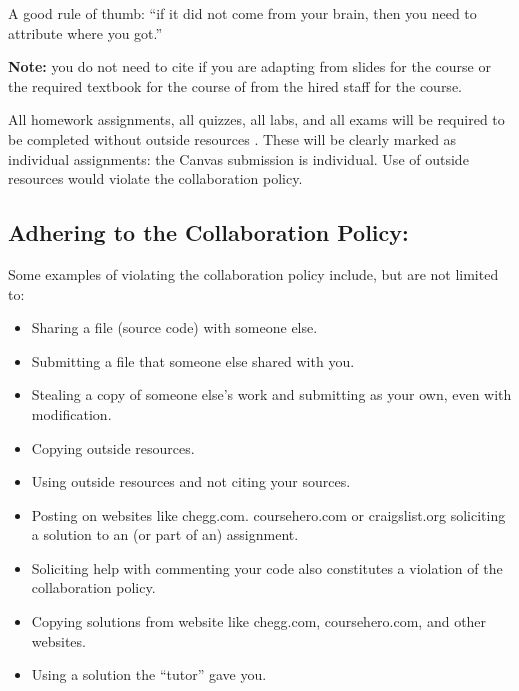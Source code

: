 
A good rule of thumb: “if it did not come from your brain, then you need to attribute where you got.”

\textbf{Note: }you do not need to cite if you are adapting from slides for the course or the required textbook for the course of from the hired staff for the course.

All homework assignments, all quizzes, all labs, and all exams will be required to be completed without outside resources . These will be clearly marked as individual assignments: the Canvas submission is individual. Use of outside resources would violate the collaboration policy.

\subsection{Adhering to the Collaboration Policy:}

Some examples of violating the collaboration policy include, but are not limited to:

\begin{itemize}
    \item Sharing a file (source code) with someone else.
    \item Submitting a file that someone else shared with you.
    \item Stealing a copy of someone else’s work and submitting as your own, even with modification.
    \item Copying outside resources.
    \item Using outside resources and not citing your sources.
    \item Posting on websites like chegg.com. coursehero.com or craigslist.org soliciting a solution to an (or part of an) assignment.
    \item Soliciting help with commenting your code also constitutes a violation of the collaboration policy.
    \item Copying solutions from website like chegg.com, coursehero.com, and other websites.
    \item Using a solution the “tutor” gave you.
\end{itemize}

